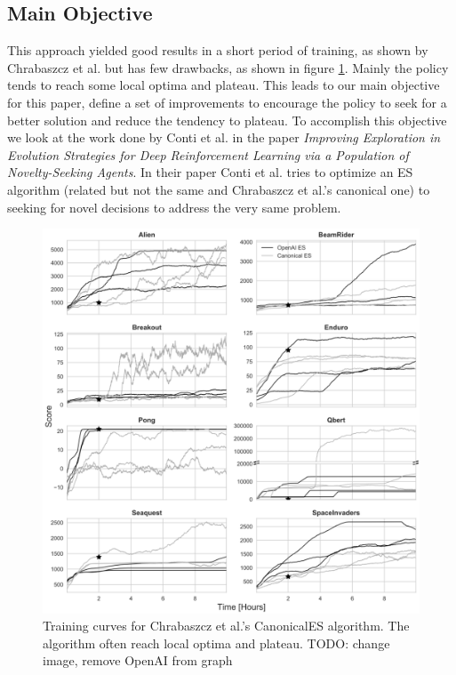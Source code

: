 \documentclass[11 pt, twocolumn]{article}
\newcommand{\todo}[1]{}
\renewcommand{\todo}[1]{{\color{red} TODO: {#1}}}
\begin{document}
\subsection{Main Objective}
This approach yielded good results in a short period of training, as shown by Chrabaszcz et al. but has few drawbacks, as shown in figure \ref{fig:canonical_results}. Mainly the policy tends to reach some local optima and plateau. This leads to our main objective for this paper, define a set of improvements to encourage the policy to seek for a better solution and reduce the tendency to plateau. To accomplish this objective we look at the work done by Conti et al. \cite{improveES} in the paper \emph{Improving Exploration in Evolution Strategies for Deep Reinforcement Learning via a Population of Novelty-Seeking Agents}. In their paper Conti et al. tries to optimize an ES algorithm (related but not the same and Chrabaszcz et al.'s canonical one) to seeking for novel decisions to address the very same problem.

\begin{figure}[h!]
  \includegraphics[width=\linewidth]{canonical_train_res.png}
  \caption{Training curves for Chrabaszcz et al.'s CanonicalES algorithm. The algorithm often reach local optima and plateau. \todo{change image, remove OpenAI from graph}}
  \label{fig:canonical_results}
\end{figure}
\end{document}
